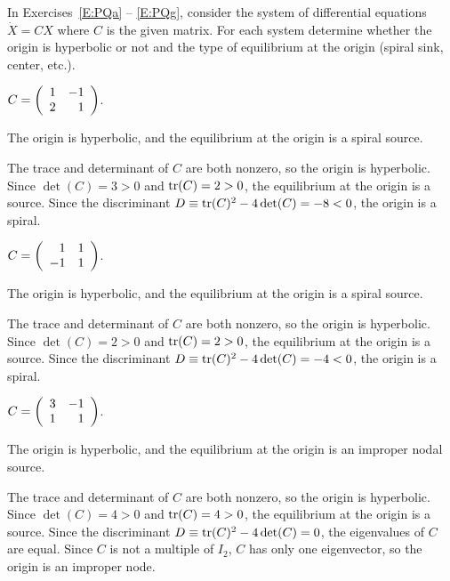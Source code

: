 \documentclass{ximera}
\begin{document}
\noindent In Exercises~\ref{E:PQa} -- \ref{E:PQg}, consider the system of
differential equations $\dot{X}=CX$ where $C$ is the given matrix.  For each
system determine whether the origin is hyperbolic or not and the type of
equilibrium at the origin (spiral sink, center, etc.).
\begin{exercise}  \label{E:PQa}
$C = \left(\begin{array}{rr} 1 & -1\\ 2 &1\end{array}\right)$.

\begin{solution}
\ans The origin is hyperbolic, and the equilibrium at the origin
is a spiral source.

\soln The trace and determinant of $C$ are both nonzero, so the origin
is hyperbolic.  Since $\det(C) = 3 > 0$ and ${\rm tr}(C) = 2 > 0$,
the equilibrium at the origin is a source.  Since the discriminant
$D \equiv {\rm tr}(C)^2 - 4\det(C) = -8 < 0$, the origin is a spiral.

\end{solution}
\end{exercise}
\begin{exercise}  \label{E:PQb}
$C = \left(\begin{array}{rr} 1 & 1\\ -1 &1\end{array}\right)$.

\begin{solution}
\ans The origin is hyperbolic, and the equilibrium at the origin
is a spiral source.

\soln The trace and determinant of $C$ are both nonzero, so the origin
is hyperbolic.  Since $\det(C) = 2 > 0$ and ${\rm tr}(C) = 2 > 0$,
the equilibrium at the origin is a source.  Since the discriminant
$D \equiv {\rm tr}(C)^2 - 4\det(C) = -4 < 0$, the origin is a spiral.

\end{solution}
\end{exercise}
\begin{exercise}  \label{E:PQc}
$C = \left(\begin{array}{rr} 3 & -1\\ 1 &1\end{array}\right)$.

\begin{solution}
\ans The origin is hyperbolic, and the equilibrium at the origin
is an improper nodal source.

\soln The trace and determinant of $C$ are both nonzero, so the origin
is hyperbolic.  Since $\det(C) = 4 > 0$ and ${\rm tr}(C) = 4 > 0$,
the equilibrium at the origin is a source.  Since the discriminant
$D \equiv {\rm tr}(C)^2 - 4\det(C) = 0$, the eigenvalues of $C$ are equal.
Since $C$ is not a multiple of $I_2$, $C$ has only one eigenvector, so
the origin is an improper node.

\end{solution}
\end{exercise}
\end{document}
